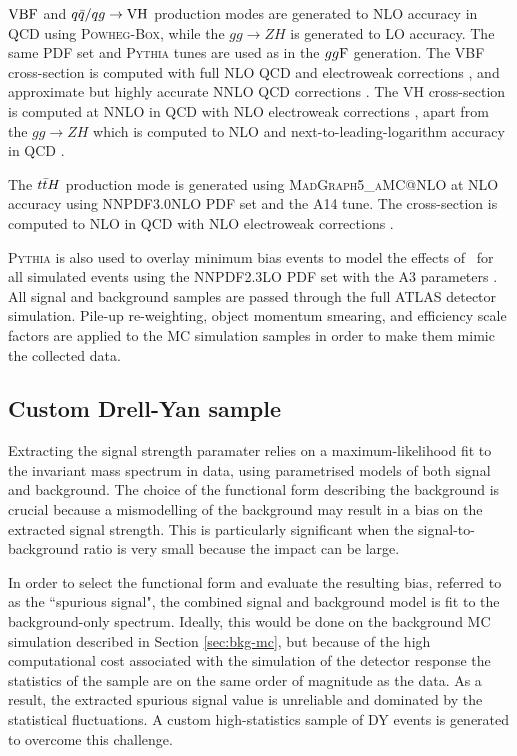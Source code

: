 $\text{VBF}$ and $q\bar{q}/qg \rightarrow \text{VH}$ production modes are
generated to NLO accuracy in QCD using \textsc{Powheg-Box},
while the $gg \rightarrow ZH$ is generated to LO accuracy. The same
PDF set and \textsc{Pythia} tunes are used as in the $gg\text{F}$
generation. The VBF cross-section is computed with full NLO QCD
and electroweak corrections \cite{Ciccolini:2007jr, Ciccolini:2007ec,
Arnold:2008rz}, and approximate but highly accurate NNLO QCD
corrections \cite{Bolzoni:2010xr}. The VH cross-section is computed at
NNLO in QCD \cite{Brein:2003wg} with NLO electroweak
corrections \cite{Ciccolini:2003jy}, apart from the
$gg \rightarrow ZH$ which is computed to NLO and next-to-leading-logarithm
accuracy in QCD \cite{Ciccolini:2003jy, Brein:2003wg, Brein:2011vx,
Altenkamp:2012sx, Denner:2014cla, Brein:2012ne, Harlander:2014wda,
Harlander:2018yio}.

The $t\bar{t} H$ production mode is generated using \textsc{MadGraph5\_aMC@NLO}
\cite{Alwall:2014hca, Artoisenet:2012st} at NLO accuracy using
NNPDF3.0NLO PDF set and the A14 tune. The cross-section is
computed to NLO in QCD with NLO electroweak corrections
\cite{Yu:2014cka, Beenakker:2002nc}.

\textsc{Pythia} is also used to
overlay minimum bias events to model the effects of \pileup~for all
simulated events using the NNPDF2.3LO PDF set \cite{Ball:2012cx}
with the A3 parameters \cite{ATL-PHYS-PUB-2016-017}. All signal
and background samples are passed through the full ATLAS
detector simulation. Pile-up re-weighting, object momentum
smearing, and efficiency scale factors are applied to the MC
simulation samples in order to make them mimic the collected data.

\subsection{Custom Drell-Yan sample}
\label{sec:hmumu:customDY}

Extracting the signal strength paramater relies on a
maximum-likelihood fit to the invariant mass spectrum in data,
using parametrised models of both signal and background. The choice
of the functional form describing the background is crucial because
a mismodelling of the background may result in a bias on the extracted
signal strength. This is particularly significant when the
signal-to-background ratio is very small because the impact can be
large.

In order to select the functional form and evaluate the resulting
bias, referred to as the ``spurious signal", the combined signal and background model is fit to the
background-only spectrum. Ideally, this would be done
on the background MC simulation described in Section \ref{sec:bkg-mc},
but because of the high computational cost associated with the 
simulation of the detector response the statistics of the sample
are on the same order of magnitude as the data. As a result,
the extracted spurious signal value is unreliable and dominated by
the statistical fluctuations. A custom high-statistics sample of DY
events is generated to overcome this challenge.

